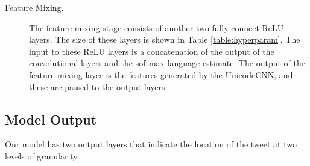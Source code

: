 \documentclass[sigconf,10pt]{acmart}
\begin{document}
\begin{description}

\item[Feature Mixing.]
The feature mixing stage consists of another two fully connect ReLU layers.
The size of these layers is shown in Table \ref{table:hyperparam}.
The input to these ReLU layers is a concatenation of the output of the convolutional layers and the softmax language estimate.
The output of the feature mixing layer is the features generated by the UnicodeCNN,
and these are passed to the output layers.


\end{description}


\subsection{Model Output}

Our model has two output layers that indicate the location of the tweet at two levels of granularity.
\end{document}

